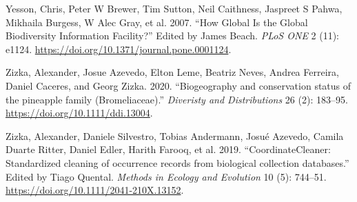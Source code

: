 \documentclass[fleqn,10pt,lineno]{wlpeerj} %
\begin{document}
\leavevmode\hypertarget{ref-Yesson2007}{}%
Yesson, Chris, Peter W Brewer, Tim Sutton, Neil Caithness, Jaspreet S Pahwa, Mikhaila Burgess, W Alec Gray, et al. 2007. ``How Global Is the Global Biodiversity Information Facility?'' Edited by James Beach. \emph{PLoS ONE} 2 (11): e1124. \url{https://doi.org/10.1371/journal.pone.0001124}.

\leavevmode\hypertarget{ref-Zizka2020b}{}%
Zizka, Alexander, Josue Azevedo, Elton Leme, Beatriz Neves, Andrea Ferreira, Daniel Caceres, and Georg Zizka. 2020. ``Biogeography and conservation status of the pineapple family (Bromeliaceae).'' \emph{Diveristy and Distributions} 26 (2): 183--95. \url{https://doi.org/10.1111/ddi.13004}.

\leavevmode\hypertarget{ref-Zizka2019}{}%
Zizka, Alexander, Daniele Silvestro, Tobias Andermann, Josué Azevedo, Camila Duarte Ritter, Daniel Edler, Harith Farooq, et al. 2019. ``CoordinateCleaner: Standardized cleaning of occurrence records from biological collection databases.'' Edited by Tiago Quental. \emph{Methods in Ecology and Evolution} 10 (5): 744--51. \url{https://doi.org/10.1111/2041-210X.13152}.
\end{document}
